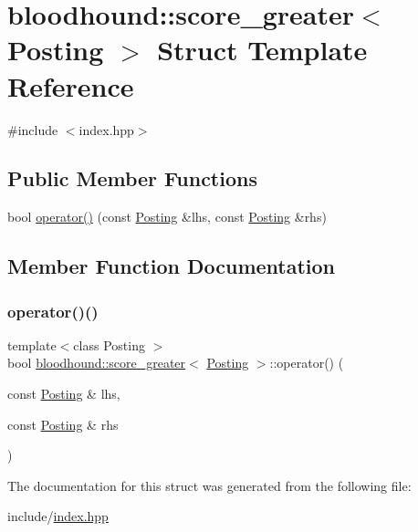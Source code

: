 \hypertarget{structbloodhound_1_1score__greater}{}\section{bloodhound\+:\+:score\+\_\+greater$<$ Posting $>$ Struct Template Reference}
\label{structbloodhound_1_1score__greater}


{\ttfamily \#include $<$index.\+hpp$>$}

\subsection*{Public Member Functions}
\begin{DoxyCompactItemize}
\item 
bool \hyperlink{structbloodhound_1_1score__greater_a56a430279ebf5d6b2526335fe3b2d668}{operator()} (const \hyperlink{structbloodhound_1_1Posting}{Posting} \&lhs, const \hyperlink{structbloodhound_1_1Posting}{Posting} \&rhs)
\end{DoxyCompactItemize}


\subsection{Member Function Documentation}
\mbox{\label{structbloodhound_1_1score__greater_a56a430279ebf5d6b2526335fe3b2d668}} 
\subsubsection{\texorpdfstring{operator()()}{operator()()}}
{\footnotesize\ttfamily template$<$class Posting $>$ \\
bool \hyperlink{structbloodhound_1_1score__greater}{bloodhound\+::score\+\_\+greater}$<$ \hyperlink{structbloodhound_1_1Posting}{Posting} $>$\+::operator() (\begin{DoxyParamCaption}\item[{const \hyperlink{structbloodhound_1_1Posting}{Posting} \&}]{lhs,  }\item[{const \hyperlink{structbloodhound_1_1Posting}{Posting} \&}]{rhs }\end{DoxyParamCaption})\hspace{0.3cm}{\ttfamily [inline]}}



The documentation for this struct was generated from the following file\+:\begin{DoxyCompactItemize}
\item 
include/\hyperlink{index_8hpp}{index.\+hpp}\end{DoxyCompactItemize}
